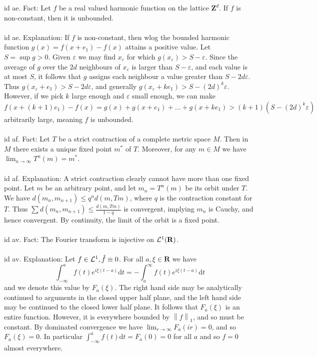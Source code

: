 \documentclass[oneside]{book}
\newcommand{\eps}{\varepsilon}
\newcommand{\Z}{\mathbf{Z}}
\newcommand{\R}{\mathbf{R}}
\newcommand{\norm}[1]{\left\lVert #1\right\rVert}
\renewcommand{\d}{\mathrm{d}}
\begin{document}
id ae. Fact: Let $f$ be a real valued harmonic function on the lattice $\Z^d$. If $f$ is non-constant, then it is unbounded. \\\\


id ae. Explanation: If $f$ is non-constant, then wlog the bounded harmonic function $g(x)=f(x+e_1)-f(x)$ attains a positive value. Let $S=\sup g > 0$. Given $\eps$ we may find $x_\eps$ for which $g(x_\eps)>S-\eps$. Since the average of $g$ over the $2d$ neighbours of $x_\eps$ is larger than $S-\eps$, and each value is at most $S$, it follows that $g$ assigns each neighbour a value greater than $S-2d\eps$. Thus $g(x_\eps + e_1) > S-2d\eps$, and generally $g(x_\eps + ke_1) > S-(2d)^k\eps$. However, if we pick $k$ large enough and $\eps$ small enough, we can make $f(x+(k+1)e_1)-f(x)=g(x)+g(x+e_1)+\dots+g(x+ke_1) > (k+1)(S-(2d)^k\eps)$ arbitrarily large, meaning $f$ is unbounded.    \\\\


id af. Fact: Let $T$ be a strict contraction of a complete metric space $M$. Then in $M$ there exists a unique fixed point $m^*$ of $T$. Moreover, for any $m\in M$ we have $\displaystyle\lim_{n\to\infty} T^{ n}(m)=m^*$. \\\\


id af. Explanation: A strict contraction clearly cannot have more than one fixed point. Let $m$ be an arbitrary point, and let $m_n=T^n(m)$ be its orbit under $T$. We have $d(m_n,m_{n+1})\le q^{n}d(m,Tm)$, where $q$ is the contraction constant for $T$. Thus $\sum d(m_n,m_{n+1}) \le \frac{d(m,Tm)}{1-q}$ is convergent, implying $m_n$ is Cauchy, and hence convergent. By continuity, the limit of the orbit is a fixed point.  \\\\


id av. Fact: The Fourier transform is injective on $\LL^1(\R)$.     \\\\


id av. Explanation: Let $f\in\mathcal{L}^1, \hat{f}\equiv 0$. For all $a,\xi\in\R$ we have
$$\int_{-\infty}^a f(t)e^{i\xi(t-a)}\d t=-\int_a^\infty f(t)e^{i\xi(t-a)}\d t$$
and we denote this value by $F_a(\xi)$. The right hand side may be analytically continued to arguments in the closed upper half plane, and the left hand side may be continued to the closed lower half plane. It follows that $F_a(\xi)$ is an entire function. However, it is everywhere bounded by $\norm{f}_1$, and so must be constant. By dominated convergence we have $\lim_{r\to\infty} F_a(ir)=0$, and so $F_a(\xi)=0$. In particular $\int_{-\infty}^a f(t)\d t=F_a(0)=0$ for all $a$ and so $f=0$ almost everywhere.    \\\\
\end{document}
